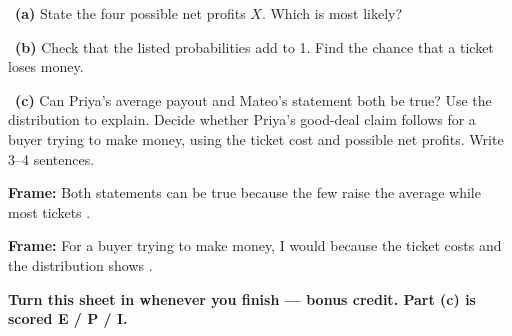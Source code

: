 \documentclass[11pt]{article}
\begin{document}
~\textbf{(a)} State the four possible net profits $X$. Which is most likely?\par
\workspace{0.7in}

~\textbf{(b)} Check that the listed probabilities add to 1. Find the chance that a ticket loses money.\par
\workspace{1.4in}

~\textbf{(c)} Can Priya's average payout and Mateo's statement both be true? Use the distribution to explain. Decide whether Priya's good-deal claim follows for a buyer trying to make money, using the ticket cost and possible net profits. Write 3--4 sentences.\par
\workspace{2.0in}

\begin{sentenceframebox}\raggedright\textbf{Frame:} Both statements can be true because the few \blank[1.4in] raise the average while most tickets \blank[1.5in].\end{sentenceframebox}

\begin{sentenceframebox}\raggedright\textbf{Frame:} For a buyer trying to make money, I would \blank[0.9in] because the ticket costs \blank[0.6in] and the distribution shows \blank[1.8in].\end{sentenceframebox}

\textbf{Turn this sheet in whenever you finish --- bonus credit. Part (c) is scored E / P / I.}\par
\end{document}
